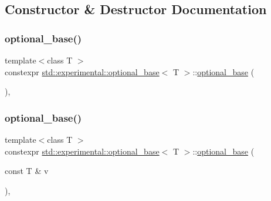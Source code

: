 \subsection{Constructor \& Destructor Documentation}
\mbox{\label{structstd_1_1experimental_1_1optional__base_a31134784c4c482947d66c600fe0dcad4}} 
\subsubsection{\texorpdfstring{optional\+\_\+base()}{optional\_base()}\hspace{0.1cm}{\footnotesize\ttfamily [1/5]}}
{\footnotesize\ttfamily template$<$class T $>$ \\
constexpr \mbox{\hyperlink{structstd_1_1experimental_1_1optional__base}{std\+::experimental\+::optional\+\_\+base}}$<$ T $>$\+::\mbox{\hyperlink{structstd_1_1experimental_1_1optional__base}{optional\+\_\+base}} (\begin{DoxyParamCaption}{ }\end{DoxyParamCaption})\hspace{0.3cm}{\ttfamily [inline]}, {\ttfamily [noexcept]}}

\mbox{\label{structstd_1_1experimental_1_1optional__base_af47cc844bf9d32ad4361be9934c20939}} 
\subsubsection{\texorpdfstring{optional\+\_\+base()}{optional\_base()}\hspace{0.1cm}{\footnotesize\ttfamily [2/5]}}
{\footnotesize\ttfamily template$<$class T $>$ \\
constexpr \mbox{\hyperlink{structstd_1_1experimental_1_1optional__base}{std\+::experimental\+::optional\+\_\+base}}$<$ T $>$\+::\mbox{\hyperlink{structstd_1_1experimental_1_1optional__base}{optional\+\_\+base}} (\begin{DoxyParamCaption}\item[{const T \&}]{v }\end{DoxyParamCaption})\hspace{0.3cm}{\ttfamily [inline]}, {\ttfamily [explicit]}}

